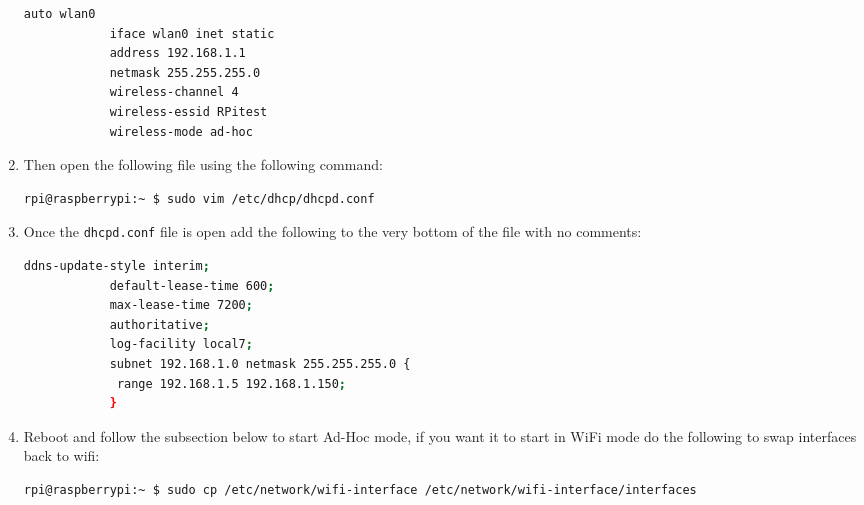 \documentclass{article}
\begin{document}
\begin{enumerate}
\begin{lstlisting}[language=bash]
            auto wlan0
            iface wlan0 inet static
            address 192.168.1.1
            netmask 255.255.255.0
            wireless-channel 4
            wireless-essid RPitest
            wireless-mode ad-hoc
        \end{lstlisting}
        \item Then open the following file using the following command:
        \begin{lstlisting}[language=bash]
            rpi@raspberrypi:~ $ sudo vim /etc/dhcp/dhcpd.conf 
        \end{lstlisting}
        \item Once the \verb |dhcpd.conf| file is open add the following to the very bottom of the file with no comments: 
        \begin{lstlisting}[language=bash]
            ddns-update-style interim;
            default-lease-time 600;
            max-lease-time 7200;
            authoritative;
            log-facility local7;
            subnet 192.168.1.0 netmask 255.255.255.0 {
             range 192.168.1.5 192.168.1.150;
            }
        \end{lstlisting}
        \item Reboot and follow the subsection below to start Ad-Hoc mode, if you want it to start in WiFi mode do the following to swap interfaces back to wifi: 
        \begin{lstlisting}[language=bash]
            rpi@raspberrypi:~ $ sudo cp /etc/network/wifi-interface /etc/network/wifi-interface/interfaces 
        \end{lstlisting}
    \end{enumerate}
\end{document}
